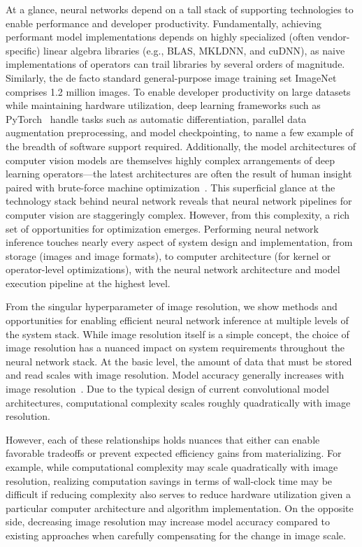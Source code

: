 At a glance, neural networks depend on a tall stack of supporting technologies to enable performance and developer productivity.
Fundamentally, achieving performant model implementations depends on highly specialized (often vendor-specific) linear algebra libraries (e.g., BLAS, MKLDNN, and cuDNN), as naive implementations of operators can trail libraries by several orders of magnitude.
Similarly, the de facto standard general-purpose image training set ImageNet~\cite{russakovsky2015imagenet} comprises 1.2 million images.
To enable developer productivity on large datasets while maintaining hardware utilization, deep learning frameworks such as PyTorch~\cite{paszke2019pytorch} handle tasks such as automatic differentiation, parallel data augmentation preprocessing, and model checkpointing, to name a few example of the breadth of software support required.
Additionally, the model architectures of computer vision models are themselves highly complex arrangements of deep learning operators---the latest architectures are often the result of human insight paired with brute-force machine optimization~\cite{tan2019efficientnet, real2019regularized, liu2018darts}.
This superficial glance at the technology stack behind neural network reveals that neural network pipelines for computer vision are staggeringly complex.
However, from this complexity, a rich set of opportunities for optimization emerges.
Performing neural network inference touches nearly every aspect of system design and implementation, from storage (images and image formats), to computer architecture (for kernel or operator-level optimizations), with the neural network architecture and model execution pipeline at the highest level.

From the singular hyperparameter of image resolution, we show methods and opportunities for enabling efficient neural network inference at multiple levels of the system stack.
While image resolution itself is a simple concept, the choice of image resolution has a nuanced impact on system requirements throughout the neural network stack.
At the basic level, the amount of data that must be stored and read scales with image resolution.
Model accuracy generally increases with image resolution~\cite{tan2019efficientnet, touvron2019fixing}.
Due to the typical design of current convolutional model architectures, computational complexity scales roughly quadratically with image resolution.

However, each of these relationships holds nuances that either can enable favorable tradeoffs or prevent expected efficiency gains from materializing.
For example, while computational complexity may scale quadratically with image resolution, realizing computation savings in terms of wall-clock time may be difficult if reducing complexity also serves to reduce hardware utilization given a particular computer architecture and algorithm implementation.
On the opposite side, decreasing image resolution may increase model accuracy compared to existing approaches when carefully compensating for the change in image scale.


